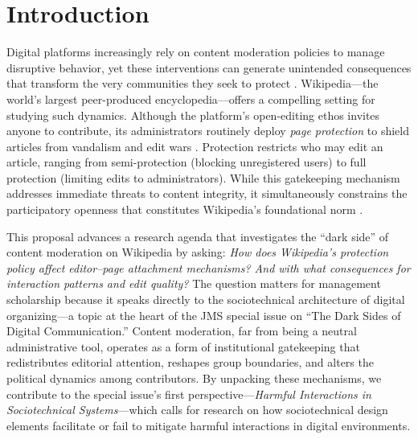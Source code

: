 \documentclass[11pt]{article}
\begin{document}
\vspace{18pt}

\section{Introduction}

Digital platforms increasingly rely on content moderation policies to manage disruptive behavior, yet these interventions can generate unintended consequences that transform the very communities they seek to protect \citep{Faraj2011, Massa2021}. Wikipedia---the world's largest peer-produced encyclopedia---offers a compelling setting for studying such dynamics. Although the platform's open-editing ethos invites anyone to contribute, its administrators routinely deploy \emph{page protection} to shield articles from vandalism and edit wars \citep{Ajmani2023, Ruprechter2025}. Protection restricts who may edit an article, ranging from semi-protection (blocking unregistered users) to full protection (limiting edits to administrators). While this gatekeeping mechanism addresses immediate threats to content integrity, it simultaneously constrains the participatory openness that constitutes Wikipedia's foundational norm \citep{Klapper2018}.

This proposal advances a research agenda that investigates the ``dark side'' of content moderation on Wikipedia by asking: \emph{How does Wikipedia's protection policy affect editor--page attachment mechanisms? And with what consequences for interaction patterns and edit quality?} The question matters for management scholarship because it speaks directly to the sociotechnical architecture of digital organizing---a topic at the heart of the JMS special issue on ``The Dark Sides of Digital Communication.'' Content moderation, far from being a neutral administrative tool, operates as a form of institutional gatekeeping that redistributes editorial attention, reshapes group boundaries, and alters the political dynamics among contributors. By unpacking these mechanisms, we contribute to the special issue's first perspective---\emph{Harmful Interactions in Sociotechnical Systems}---which calls for research on how sociotechnical design elements facilitate or fail to mitigate harmful interactions in digital environments.
\end{document}
